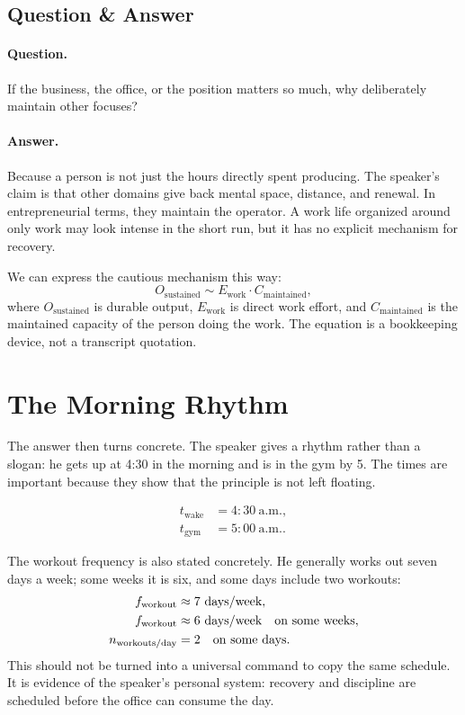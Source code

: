 \subsection{Question \& Answer}

\paragraph{Question.}
If the business, the office, or the position matters so much, why deliberately maintain other focuses?

\paragraph{Answer.}
Because a person is not just the hours directly spent producing. The speaker's claim is that other domains give back mental space, distance, and renewal. In entrepreneurial terms, they maintain the operator. A work life organized around only work may look intense in the short run, but it has no explicit mechanism for recovery.

We can express the cautious mechanism this way:
\begin{equation}
O_{\mathrm{sustained}}
\sim
E_{\mathrm{work}}\cdot C_{\mathrm{maintained}},
\end{equation}
where \(O_{\mathrm{sustained}}\) is durable output, \(E_{\mathrm{work}}\) is direct work effort, and \(C_{\mathrm{maintained}}\) is the maintained capacity of the person doing the work. The equation is a bookkeeping device, not a transcript quotation.

\section{The Morning Rhythm}

The answer then turns concrete. The speaker gives a rhythm rather than a slogan: he gets up at 4:30 in the morning and is in the gym by 5. The times are important because they show that the principle is not left floating.

\begin{align}
t_{\mathrm{wake}} &= 4{:}30\ \mathrm{a.m.},\\
t_{\mathrm{gym}} &= 5{:}00\ \mathrm{a.m.}.
\end{align}

The workout frequency is also stated concretely. He generally works out seven days a week; some weeks it is six, and some days include two workouts:
\begin{align}
f_{\mathrm{workout}} &\approx 7\ \hbox{days/week},\\
f_{\mathrm{workout}} &\approx 6\ \hbox{days/week}\quad \hbox{on some weeks},\\
n_{\mathrm{workouts/day}} &= 2\quad \hbox{on some days}.
\end{align}
This should not be turned into a universal command to copy the same schedule. It is evidence of the speaker's personal system: recovery and discipline are scheduled before the office can consume the day.

